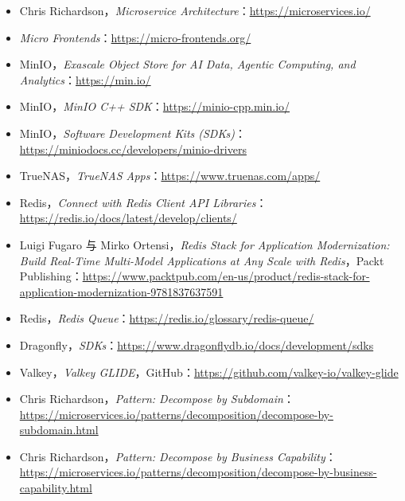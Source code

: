 \begin{itemize}
\item Chris Richardson，\emph{Microservice Architecture}：\href{https://microservices.io/}{https://microservices.io/}
\item \emph{Micro Frontends}：\href{https://micro-frontends.org/}{https://micro-frontends.org/}
\item MinIO，\emph{Exascale Object Store for AI Data, Agentic Computing, and Analytics}：\href{https://min.io/}{https://min.io/}
\item MinIO，\emph{MinIO C++ SDK}：\href{https://minio-cpp.min.io/}{https://minio-cpp.min.io/}
\item MinIO，\emph{Software Development Kits (SDKs)}：\href{https://miniodocs.cc/developers/minio-drivers}{https://miniodocs.cc/developers/minio-drivers}
\item TrueNAS，\emph{TrueNAS Apps}：\href{https://www.truenas.com/apps/}{https://www.truenas.com/apps/}
\item Redis，\emph{Connect with Redis Client API Libraries}：\href{https://redis.io/docs/latest/develop/clients/}{https://redis.io/docs/latest/develop/clients/}
\item Luigi Fugaro 与 Mirko Ortensi，\emph{Redis Stack for Application Modernization: Build Real-Time Multi-Model Applications at Any Scale with Redis}，Packt Publishing：\href{https://www.packtpub.com/en-us/product/redis-stack-for-application-modernization-9781837637591}{https://www.packtpub.com/en-us/product/redis-stack-for-application-modernization-9781837637591}
\item Redis，\emph{Redis Queue}：\href{https://redis.io/glossary/redis-queue/}{https://redis.io/glossary/redis-queue/}
\item Dragonfly，\emph{SDKs}：\href{https://www.dragonflydb.io/docs/development/sdks}{https://www.dragonflydb.io/docs/development/sdks}
\item Valkey，\emph{Valkey GLIDE}，GitHub：\href{https://github.com/valkey-io/valkey-glide}{https://github.com/valkey-io/valkey-glide}
\item Chris Richardson，\emph{Pattern: Decompose by Subdomain}：\href{https://microservices.io/patterns/decomposition/decompose-by-subdomain.html}{https://microservices.io/patterns/decomposition/decompose-by-subdomain.html}
\item Chris Richardson，\emph{Pattern: Decompose by Business Capability}：\href{https://microservices.io/patterns/decomposition/decompose-by-business-capability.html}{https://microservices.io/patterns/decomposition/decompose-by-business-capability.html}

\end{itemize}
